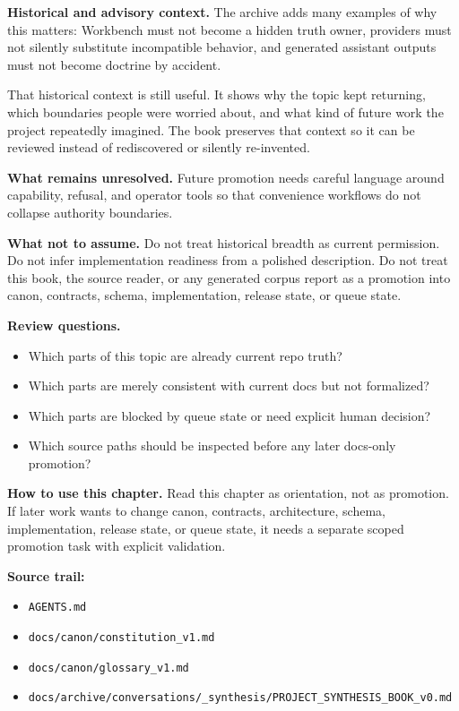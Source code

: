 \documentclass[10.5pt,a4paper,openany]{book}
\begin{document}
\textbf{Historical and advisory context.} The archive adds many examples of why this matters: Workbench must not become a hidden truth owner, providers must not silently substitute incompatible behavior, and generated assistant outputs must not become doctrine by accident.\allowbreak{}


That historical context is still useful.\allowbreak{} It shows why the topic kept returning, which boundaries people were worried about, and what kind of future work the project repeatedly imagined.\allowbreak{} The book preserves that context so it can be reviewed instead of rediscovered or silently re-\allowbreak{}invented.\allowbreak{}


\textbf{What remains unresolved.} Future promotion needs careful language around capability, refusal, and operator tools so that convenience workflows do not collapse authority boundaries.\allowbreak{}


\textbf{What not to assume.} Do not treat historical breadth as current permission.\allowbreak{} Do not infer implementation readiness from a polished description.\allowbreak{} Do not treat this book, the source reader, or any generated corpus report as a promotion into canon, contracts, schema, implementation, release state, or queue state.\allowbreak{}


\textbf{Review questions.}


\begin{itemize}
\item Which parts of this topic are already current repo truth?
\item Which parts are merely consistent with current docs but not formalized?
\item Which parts are blocked by queue state or need explicit human decision?
\item Which source paths should be inspected before any later docs-\allowbreak{}only promotion?
\end{itemize}

\textbf{How to use this chapter.} Read this chapter as orientation, not as promotion.\allowbreak{} If later work wants to change canon, contracts, architecture, schema, implementation, release state, or queue state, it needs a separate scoped promotion task with explicit validation.\allowbreak{}


\textbf{Source trail:}


\begin{itemize}
\item \texttt{AGENTS.\allowbreak{}md}
\item \texttt{docs/\allowbreak{}canon/\allowbreak{}constitution\_\allowbreak{}v1.\allowbreak{}md}
\item \texttt{docs/\allowbreak{}canon/\allowbreak{}glossary\_\allowbreak{}v1.\allowbreak{}md}
\item \texttt{docs/\allowbreak{}archive/\allowbreak{}conversations/\allowbreak{}\_\allowbreak{}synthesis/\allowbreak{}PROJECT\_\allowbreak{}SYNTHESIS\_\allowbreak{}BOOK\_\allowbreak{}v0.\allowbreak{}md}
\end{itemize}
\end{document}
